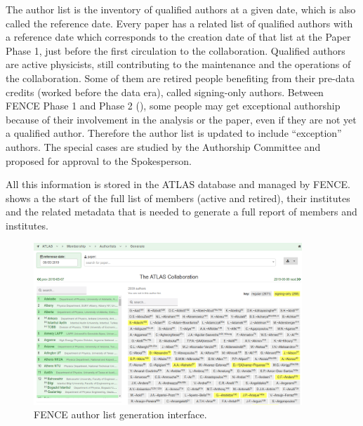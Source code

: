 The author list is the inventory of qualified authors at a given date, which is also called the reference date. Every paper has a related list of qualified authors with a reference date which corresponds to the creation date of that list at the Paper Phase 1, just before the first circulation to the collaboration. Qualified authors are active physicists, still contributing to the maintenance and the operations of the collaboration.
Some of them are retired people benefiting from their pre-data credits (worked before the data era), called signing-only authors.
Between FENCE Phase 1 and Phase 2 (), some people may get exceptional authorship because of their involvement in the analysis or the paper,
even if they are not yet a qualified author.
Therefore the author list is updated to include \enquote{exception} authors.
The special cases are studied by the Authorship Committee and proposed for approval to the Spokesperson.

All this information is stored in the ATLAS database and managed by FENCE\@.
 shows a the start of the full list of members (active and retired), their institutes and the related metadata that is needed to generate a full report of members and institutes.

\begin{figure}[htb]
  \centering
  \includegraphics[width=0.9\textwidth]{figures/authorlist_generation.png}
  \caption{FENCE author list generation interface.
    }%
  \label{fig:authorlist_generation}
\end{figure}

